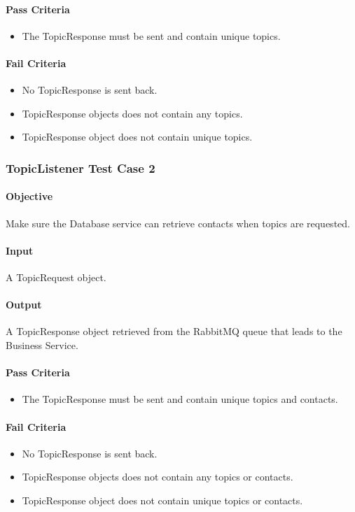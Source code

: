 \documentclass[hidelinks,english]{article}
\begin{document}
				\paragraph{Pass Criteria}
				\begin{itemize}
					\item The TopicResponse must be sent and contain unique topics.
				\end{itemize}
				\paragraph{Fail Criteria}
				\begin{itemize}
					\item No TopicResponse is sent back.
					\item TopicResponse objects does not contain any topics.
					\item TopicResponse object does not contain unique topics.
				\end{itemize}
				
			\subsubsection{TopicListener Test Case 2}\label{databasetopiclistenertest2}
				\paragraph{Objective} Make sure the Database service can retrieve contacts when topics are requested.
				\paragraph{Input} A TopicRequest object.
				\paragraph{Output} A TopicResponse object retrieved from the RabbitMQ queue that leads to the Business Service.
				\paragraph{Pass Criteria}
				\begin{itemize}
					\item The TopicResponse must be sent and contain unique topics and contacts.
				\end{itemize}
				\paragraph{Fail Criteria}
				\begin{itemize}
					\item No TopicResponse is sent back.
					\item TopicResponse objects does not contain any topics or contacts.
					\item TopicResponse object does not contain unique topics or contacts.
				\end{itemize}
				
\end{document}

